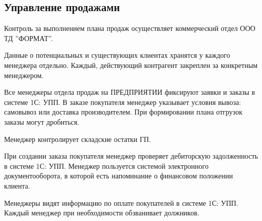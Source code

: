 \newpage
\subsection{Управление продажами}
\label{bp:SalesManagment}


Контроль за выполнением плана продаж осуществляет коммерческий отдел ООО ТД ''ФОРМАТ''.

Данные о потенциальных и существующих клиентах хранятся у каждого менеджера отдельно.
Каждый, действующий контрагент закреплен за конкретным менеджером. 

Все менеджеры отдела продаж на ПРЕДПРИЯТИИ фиксируют заявки и заказы в системе 1С: УПП. В заказе покупателя менеджер указывает условия вывоза: самовывоз или доставка производителем.
При формировании плана отгрузок заказы могут дробиться.

Менеджер контролирует складские остатки ГП.

При создании заказа покупателя менеджер проверяет дебиторскую задолженность в системе 1С: УПП. Менеджер пользуется системой электронного документооборота, в которой есть напоминание о финансовом положении клиента.

Менеджеры видят информацию по оплате покупателей в системе 1С: УПП. Каждый менеджер при необходимости обзванивает должников.








